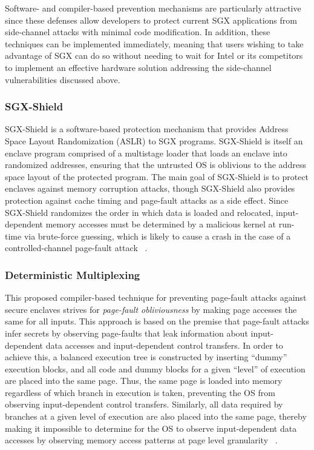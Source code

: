 Software- and compiler-based prevention mechanisms are particularly attractive since these defenses allow developers to protect current SGX applications from side-channel attacks with minimal code modification. In addition, these techniques can be implemented immediately, meaning that users wishing to take advantage of SGX can do so without needing to wait for Intel or its competitors to implement an effective hardware solution addressing the side-channel vulnerabilities discussed above.

\subsubsection{SGX-Shield}

SGX-Shield is a software-based protection mechanism that provides Address Space Layout Randomization (ASLR) to SGX programs. SGX-Shield is itself an enclave program comprised of a multistage loader that loads an enclave into randomized addresses, ensuring that the untrusted OS is oblivious to the address space layout of the protected program. The main goal of SGX-Shield is to protect enclaves against memory corruption attacks, though SGX-Shield also provides protection against cache timing and page-fault attacks as a side effect. Since SGX-Shield randomizes the order in which data is loaded and relocated, input-dependent memory accesses must be determined by a malicious kernel at run-time via brute-force guessing, which is likely to cause a crash in the case of a controlled-channel page-fault attack ~\cite{seo_sgx-shield:_2017}. 

\subsubsection{Deterministic Multiplexing}

This proposed compiler-based technique for preventing page-fault attacks against secure enclaves strives for \emph{page-fault obliviousness} by making page accesses the same for all inputs. This approach is based on the premise that page-fault attacks infer secrets by observing page-faults that leak information about input-dependent data accesses and input-dependent control transfers. In order to achieve this, a balanced execution tree is constructed by inserting ``dummy'' execution blocks, and all code and dummy blocks for a given ``level'' of execution are placed into the same page. Thus, the same page is loaded into memory regardless of which branch in execution is taken, preventing the OS from observing input-dependent control transfers. Similarly, all data required by branches at a given level of execution are also placed into the same page, thereby making it impossible to determine for the OS to observe input-dependent data accesses by observing memory access patterns at page level granularity ~\cite{shinde_preventing_2015}. 

